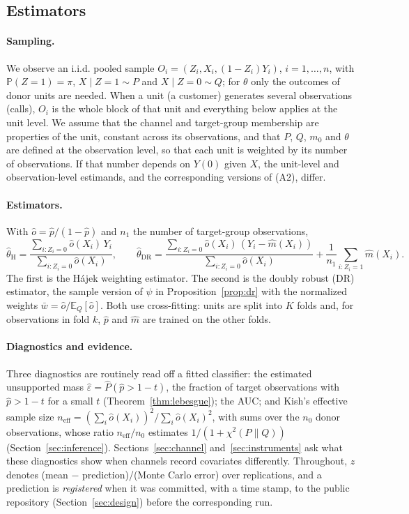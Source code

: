 \documentclass[11pt,a4paper]{article}
\newcommand{\E}{\mathbb{E}}
\newcommand{\PP}{\mathbb{P}}
\newcommand{\neff}{n_{\mathrm{eff}}}
\theoremstyle{plain}
\theoremstyle{definition}
\begin{document}
\subsection{Estimators}\label{sec:estimators}

\paragraph{Sampling.} We observe an i.i.d. pooled sample $O_i=(Z_i,X_i,(1-Z_i)Y_i)$, $i=1,\dots,n$, with $\PP(Z=1)=\pi$, $X\mid Z=1\sim P$ and $X\mid Z=0\sim Q$; for $\theta$ only the outcomes of donor units are needed. When a unit (a customer) generates several observations (calls), $O_i$ is the whole block of that unit and everything below applies at the unit level. We assume that the channel and target-group membership are properties of the unit, constant across its observations, and that $P$, $Q$, $m_0$ and $\theta$ are defined at the observation level, so that each unit is weighted by its number of observations. If that number depends on $Y(0)$ given $X$, the unit-level and observation-level estimands, and the corresponding versions of (A2), differ.

\paragraph{Estimators.} With $\hat o=\hat p/(1-\hat p)$ and $n_1$ the number of target-group observations,
\[
\hat\theta_{\mathrm{H}}=\frac{\sum_{i:Z_i=0}\hat o(X_i)\,Y_i}{\sum_{i:Z_i=0}\hat o(X_i)},\qquad
\hat\theta_{\mathrm{DR}}=\frac{\sum_{i:Z_i=0}\hat o(X_i)\,(Y_i-\hat m(X_i))}{\sum_{i:Z_i=0}\hat o(X_i)}+\frac1{n_1}\sum_{i:Z_i=1}\hat m(X_i).
\]
The first is the Hájek weighting estimator. The second is the doubly robust (DR) estimator, the sample version of $\psi$ in Proposition~\ref{prop:dr} with the normalized weights $\bar w=\hat o/\E_Q[\hat o]$. Both use cross-fitting: units are split into $K$ folds and, for observations in fold $k$, $\hat p$ and $\hat m$ are trained on the other folds.

\paragraph{Diagnostics and evidence.} Three diagnostics are routinely read off a fitted classifier: the estimated unsupported mass $\hat\varepsilon=\hat P(\hat p>1-t)$, the fraction of target observations with $\hat p>1-t$ for a small $t$ (Theorem~\ref{thm:lebesgue}); the AUC; and Kish's \citeyearpar{kish1965} effective sample size $\neff=(\sum_i\hat o(X_i))^2/\sum_i\hat o(X_i)^2$, with sums over the $n_0$ donor observations, whose ratio $\neff/n_0$ estimates $1/(1+\chi^2(P\|Q))$ (Section~\ref{sec:inference}). Sections~\ref{sec:channel} and~\ref{sec:instruments} ask what these diagnostics show when channels record covariates differently. Throughout, $z$ denotes (mean $-$ prediction)/(Monte Carlo error) over replications, and a prediction is \emph{registered} when it was committed, with a time stamp, to the public repository (Section~\ref{sec:design}) before the corresponding run.
\end{document}
